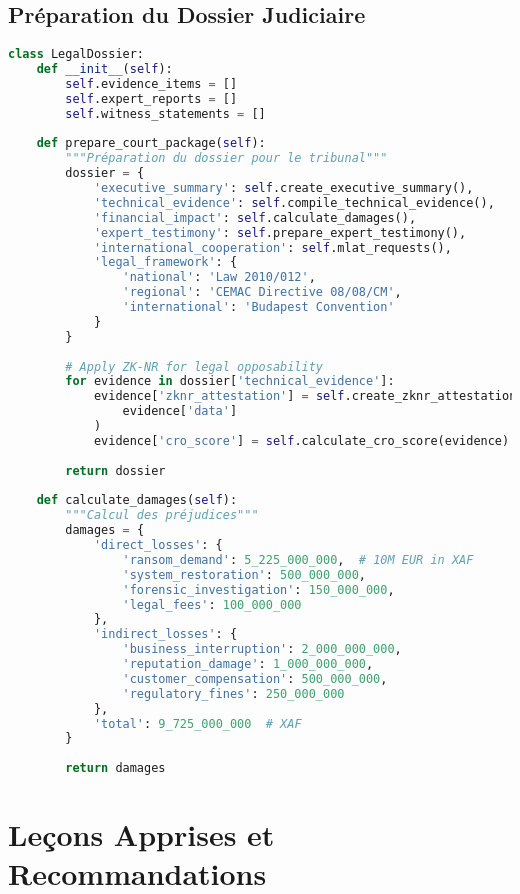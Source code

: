 \subsection{Préparation du Dossier Judiciaire}
\begin{lstlisting}[language=Python, caption=Préparation du dossier pour le tribunal]
class LegalDossier:
    def __init__(self):
        self.evidence_items = []
        self.expert_reports = []
        self.witness_statements = []
    
    def prepare_court_package(self):
        """Préparation du dossier pour le tribunal"""
        dossier = {
            'executive_summary': self.create_executive_summary(),
            'technical_evidence': self.compile_technical_evidence(),
            'financial_impact': self.calculate_damages(),
            'expert_testimony': self.prepare_expert_testimony(),
            'international_cooperation': self.mlat_requests(),
            'legal_framework': {
                'national': 'Law 2010/012',
                'regional': 'CEMAC Directive 08/08/CM',
                'international': 'Budapest Convention'
            }
        }
        
        # Apply ZK-NR for legal opposability
        for evidence in dossier['technical_evidence']:
            evidence['zknr_attestation'] = self.create_zknr_attestation(
                evidence['data']
            )
            evidence['cro_score'] = self.calculate_cro_score(evidence)
        
        return dossier
    
    def calculate_damages(self):
        """Calcul des préjudices"""
        damages = {
            'direct_losses': {
                'ransom_demand': 5_225_000_000,  # 10M EUR in XAF
                'system_restoration': 500_000_000,
                'forensic_investigation': 150_000_000,
                'legal_fees': 100_000_000
            },
            'indirect_losses': {
                'business_interruption': 2_000_000_000,
                'reputation_damage': 1_000_000_000,
                'customer_compensation': 500_000_000,
                'regulatory_fines': 250_000_000
            },
            'total': 9_725_000_000  # XAF
        }
        
        return damages
\end{lstlisting}

\section{Leçons Apprises et Recommandations}

